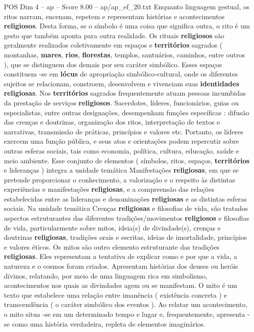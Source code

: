 \begin{textsample}{POS Dim 4 – ap – Score 8.00 – ap/ap\_ef\_20.txt}
Enquanto linguagem gestual, os ritos narram, encenam, repetem e representam histórias e acontecimentos \textbf{religiosos}.
Desta forma, se o símbolo é uma coisa que significa outra, o rito é um gesto que também aponta para outra realidade.
Os rituais \textbf{religiosos} são geralmente realizados coletivamente em espaços e \textbf{territórios} sagrados ( montanhas, \textbf{mares}, \textbf{rios}, \textbf{florestas}, templos, santuários, caminhos, entre outros ), que se distinguem dos demais por seu caráter simbólico.
Esses espaços constituem -se em \textbf{lócus} de apropriação simbólico-cultural, onde os diferentes sujeitos se relacionam, constroem, desenvolvem e vivenciam suas \textbf{identidades} \textbf{religiosas}.
Nos \textbf{territórios} sagrados frequentemente atuam pessoas incumbidas da prestação de serviços \textbf{religiosos}.
Sacerdotes, líderes, funcionários, guias ou especialistas, entre outras designações, desempenham funções específicas : difusão das crenças e doutrinas, organização dos ritos, interpretação de textos e narrativas, transmissão de práticas, princípios e valores etc.
Portanto, os líderes exercem uma função pública, e seus atos e orientações podem repercutir sobre outras esferas sociais, tais como economia, política, cultura, educação, saúde e meio ambiente.
Esse conjunto de elementos ( símbolos, ritos, espaços, \textbf{territórios} e lideranças ) integra a unidade temática Manifestações \textbf{religiosas}, em que se pretende proporcionar o conhecimento, a valorização e o respeito às distintas experiências e manifestações \textbf{religiosas}, e a compreensão das relações estabelecidas entre as lideranças e denominações \textbf{religiosas} e as distintas esferas sociais.
Na unidade temática Crenças \textbf{religiosas} e filosofias de vida, são tratados aspectos estruturantes das diferentes tradições/movimentos \textbf{religiosos} e filosofias de vida, particularmente sobre mitos, ideia(s) de divindade(s), crenças e doutrinas \textbf{religiosas}, tradições orais e escritas, ideias de imortalidade, princípios e valores éticos.
Os mitos são outro elemento estruturante das tradições \textbf{religiosas}.
Eles representam a tentativa de explicar como e por que a vida, a natureza e o cosmos foram criados.
Apresentam histórias dos deuses ou heróis divinos, relatando, por meio de uma linguagem rica em simbolismo, acontecimentos nos quais as divindades agem ou se manifestam.
O mito é um texto que estabelece uma relação entre imanência ( existência concreta ) e transcendência ( o caráter simbólico dos eventos ).
Ao relatar um acontecimento, o mito situa -se em um determinado tempo e lugar e, frequentemente, apresenta -se como uma história verdadeira, repleta de elementos imaginários.

\end{textsample}
